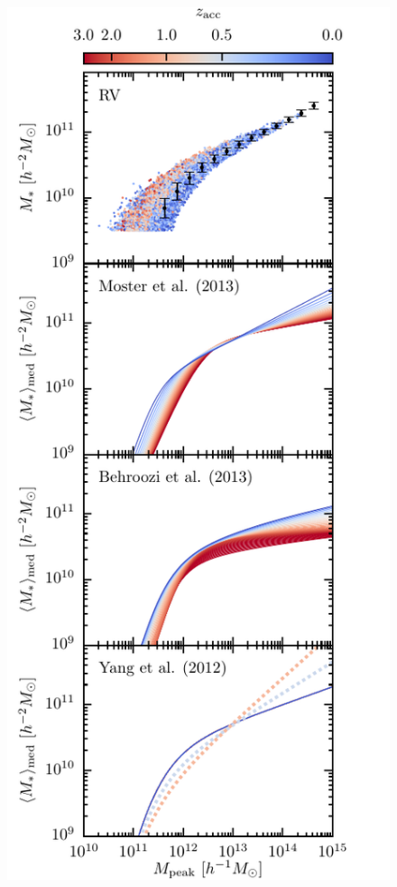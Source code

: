 \documentclass[useAMS,fleqn,usenatbib]{mnras}
\begin{document}
\begin{figure}
    \includegraphics[width=\columnwidth]{figures/SMHM_comparison.pdf}

\end{figure}
\end{document}

